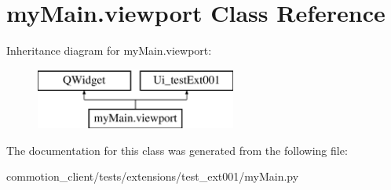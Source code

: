 \hypertarget{classmyMain_1_1viewport}{\section{my\-Main.\-viewport Class Reference}
\label{classmyMain_1_1viewport}
}
Inheritance diagram for my\-Main.\-viewport\-:\begin{figure}[H]
\begin{center}
\leavevmode
\includegraphics[height=2.000000cm]{classmyMain_1_1viewport}
\end{center}
\end{figure}


The documentation for this class was generated from the following file\-:\begin{DoxyCompactItemize}
\item 
commotion\-\_\-client/tests/extensions/test\-\_\-ext001/my\-Main.\-py\end{DoxyCompactItemize}
